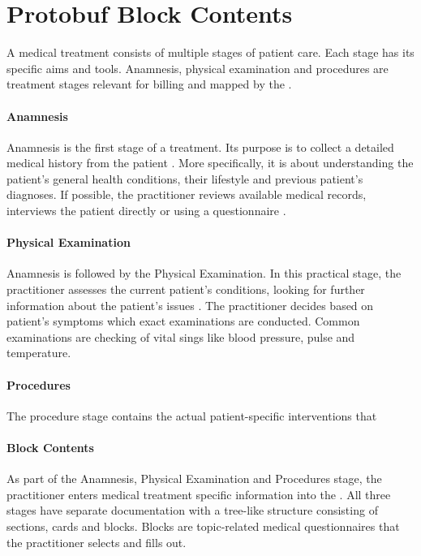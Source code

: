 \section{Protobuf Block Contents}\label{sec:protobuf-block-contents}

A medical treatment consists of multiple stages of patient care.
Each stage has its specific aims and tools.
Anamnesis, physical examination and procedures are treatment stages relevant for billing and mapped by the \AVS.

\paragraph{Anamnesis}
Anamnesis is the first stage of a treatment.
Its purpose is to collect a detailed medical history from the patient \cite{lino2021medical}.
More specifically, it is about understanding the patient's general health conditions,
their lifestyle and previous patient's diagnoses.
If possible, the practitioner reviews available medical records,
interviews the patient directly or using a questionnaire \cite{zhang2011anamnevis}.

\paragraph{Physical Examination}
Anamnesis is followed by the Physical Examination.
In this practical stage, the practitioner assesses the current patient's conditions,
looking for further information about the patient's issues \cite{seidel2010mosby}.
The practitioner decides based on patient's symptoms which exact examinations are conducted.
Common examinations are checking of vital sings like blood pressure, pulse and temperature.

\paragraph{Procedures}
The procedure stage contains the actual patient-specific interventions that \todo

\paragraph{Block Contents}
As part of the Anamnesis, Physical Examination and Procedures stage,
the practitioner enters medical treatment specific information into the \AVS.
All three stages have separate documentation with a tree-like structure consisting of sections, cards and blocks.
Blocks are topic-related medical questionnaires that the practitioner selects and fills out.

